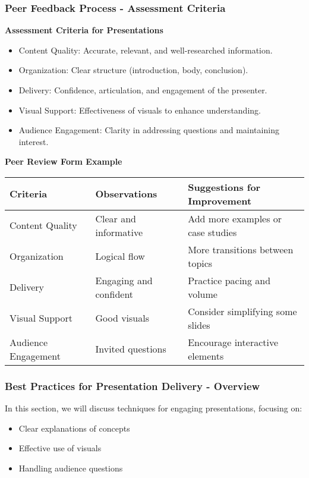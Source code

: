 \documentclass[aspectratio=169]{beamer}
\begin{document}
\begin{frame}[fragile]
    \frametitle{Peer Feedback Process - Assessment Criteria}
    
    \textbf{Assessment Criteria for Presentations}
    \begin{itemize}
        \item Content Quality: Accurate, relevant, and well-researched information.
        \item Organization: Clear structure (introduction, body, conclusion).
        \item Delivery: Confidence, articulation, and engagement of the presenter.
        \item Visual Support: Effectiveness of visuals to enhance understanding.
        \item Audience Engagement: Clarity in addressing questions and maintaining interest.
    \end{itemize}
    
    \textbf{Peer Review Form Example}
    \begin{tabular}{|l|l|l|}
        \hline
        \textbf{Criteria} & \textbf{Observations} & \textbf{Suggestions for Improvement} \\
        \hline
        Content Quality & Clear and informative & Add more examples or case studies \\
        \hline
        Organization & Logical flow & More transitions between topics \\
        \hline
        Delivery & Engaging and confident & Practice pacing and volume \\
        \hline
        Visual Support & Good visuals & Consider simplifying some slides \\
        \hline
        Audience Engagement & Invited questions & Encourage interactive elements \\
        \hline
    \end{tabular}
\end{frame}

\begin{frame}[fragile]
    \frametitle{Best Practices for Presentation Delivery - Overview}
    In this section, we will discuss techniques for engaging presentations, focusing on:
    \begin{itemize}
        \item Clear explanations of concepts
        \item Effective use of visuals
        \item Handling audience questions
    \end{itemize}
\end{frame}
\end{document}
